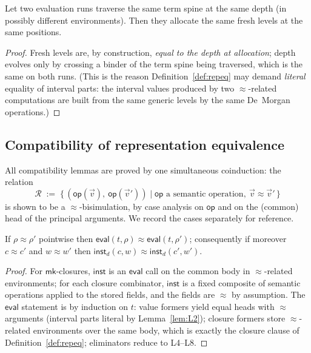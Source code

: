 \documentclass{lmcs}
\newcommand{\repeq}{\approx}
\newcommand{\evalop}{\mathsf{eval}}
\newcommand{\capp}{\mathsf{inst}}
\begin{document}
\begin{lem}\label{lem:L2}
  Let two evaluation runs traverse the same term spine at the same
  depth (in possibly different environments).  Then they allocate the
  same fresh levels at the same positions.
\end{lem}
\begin{proof}
  Fresh levels are, by construction, \emph{equal to the depth at
  allocation}; depth evolves only by crossing a binder of the term
  spine being traversed, which is the same on both runs.  (This is
  the reason Definition~\ref{def:repeq} may demand \emph{literal}
  equality of interval parts: the interval values produced by two
  $\repeq$-related computations are built from the same generic
  levels by the same De~Morgan operations.)
\end{proof}

\subsection{Compatibility of representation equivalence}
\label{app:repeq}

All compatibility lemmas are proved by one simultaneous coinduction:
the relation
\[
  \mathcal{R} \;:=\; \{\,(\mathsf{op}(\vec v),\ \mathsf{op}(\vec v'))
    \mid \mathsf{op} \text{ a semantic operation},\ \vec v \repeq
    \vec v'\,\}
\]
is shown to be a $\repeq$-bisimulation, by case analysis on
$\mathsf{op}$ and on the (common) head of the principal arguments.
We record the cases separately for reference.

\begin{lem}\label{lem:L3}
  If $\rho \repeq \rho'$ pointwise then
  $\evalop(t, \rho) \repeq \evalop(t, \rho')$; consequently if
  moreover $c \repeq c'$ and $w \repeq w'$ then
  $\capp_d(c, w) \repeq \capp_d(c', w')$.
\end{lem}
\begin{proof}
  For $\mathsf{mk}$-closures, $\capp$ is an $\evalop$ call on the
  common body in $\repeq$-related environments; for each closure
  combinator, $\capp$ is a fixed composite of semantic operations
  applied to the stored fields, and the fields are $\repeq$ by
  assumption.  The $\evalop$ statement is by induction on $t$: value
  formers yield equal heads with $\repeq$ arguments (interval parts
  literal by Lemma~\ref{lem:L2}); closure formers store
  $\repeq$-related environments over the same body, which is exactly
  the closure clause of Definition~\ref{def:repeq}; eliminators
  reduce to L4--L8.
\end{proof}
\end{document}
